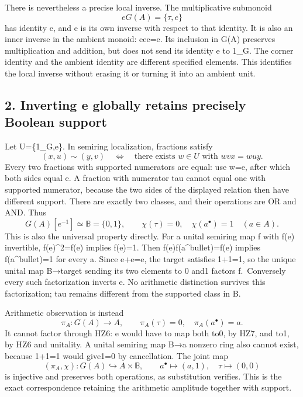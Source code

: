 \documentclass[
]{article}
\begin{document}
There is nevertheless a precise local inverse. The multiplicative
submonoid \[
eG(A)=\{\tau,e\}
\tag{HZ4}
\] has identity e, and e is its own inverse with respect to that
identity. It is also an inner inverse in the ambient monoid: eee=e. Its
inclusion in G(A) preserves multiplication and addition, but does not
send its identity e to 1\_G. The corner identity and the ambient
identity are different specified elements. This identifies the local
inverse without erasing it or turning it into an ambient unit.

\subsection{2. Inverting e globally retains precisely Boolean
support}\label{inverting-e-globally-retains-precisely-boolean-support}

Let U=\{1\_G,e\}. In semiring localization, fractions satisfy \[
(x,u)\sim(y,v)\quad\Longleftrightarrow\quad
\text{there exists }w\in U\text{ with }wvx=wuy.
\tag{HZ5}
\] Every two fractions with supported numerators are equal: use w=e,
after which both sides equal e. A fraction with numerator tau cannot
equal one with supported numerator, because the two sides of the
displayed relation then have different support. There are exactly two
classes, and their operations are OR and AND. Thus \[
G(A)[e^{-1}]\simeq\mathbb B=\{0,1\},\qquad
\chi(\tau)=0,\quad\chi(a^\bullet)=1\quad(a\in A).
\tag{HZ6}
\] This is also the universal property directly. For a unital semiring
map f with f(e) invertible, f(e)\^{}2=f(e) implies f(e)=1. Then
f(e)f(a\^{}bullet)=f(e) implies f(a\^{}bullet)=1 for every a. Since
e+e=e, the target satisfies 1+1=1, so the unique unital map B→target
sending its two elements to 0 and1 factors f.~Conversely every such
factorization inverts e. No arithmetic distinction survives this
factorization; tau remains different from the supported class in B.

Arithmetic observation is instead \[
\pi_A:G(A)\longrightarrow A,\qquad
\pi_A(\tau)=0,\quad\pi_A(a^\bullet)=a.
\tag{HZ7}
\] It cannot factor through HZ6: e would have to map both to0, by HZ7,
and to1, by HZ6 and unitality. A unital semiring map B→a nonzero ring
also cannot exist, because 1+1=1 would give1=0 by cancellation. The
joint map \[
(\pi_A,\chi):G(A)\hookrightarrow A\times\mathbb B,\qquad
a^\bullet\mapsto(a,1),\quad\tau\mapsto(0,0)
\tag{HZ8}
\] is injective and preserves both operations, as substitution verifies.
This is the exact correspondence retaining the arithmetic amplitude
together with support.
\end{document}
